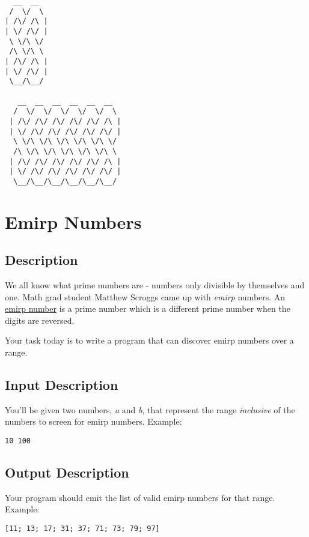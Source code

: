 \begin{lstlisting}
  __  __ 
 /  \/  \
| /\/ /\ |
| \/ /\/ |
 \ \/\ \/
 /\ \/\ \
| /\/ /\ |
| \/ /\/ |
 \__/\__/

   __  __  __  __  __  __
  /  \/  \/  \/  \/  \/  \
 | /\/ /\/ /\/ /\/ /\/ /\ |
 | \/ /\/ /\/ /\/ /\/ /\/ |
  \ \/\ \/\ \/\ \/\ \/\ \/
  /\ \/\ \/\ \/\ \/\ \/\ \
 | /\/ /\/ /\/ /\/ /\/ /\ |
 | \/ /\/ /\/ /\/ /\/ /\/ |
  \__/\__/\__/\__/\__/\__/
\end{lstlisting}


\section{Emirp Numbers}

\subsection*{Description}\label{description-23}

We all know what prime numbers are - numbers only divisible by
themselves and one. Math grad student Matthew Scroggs came up with
\emph{emirp} numbers. An
\href{https://en.wikipedia.org/wiki/Emirp}{emirp number} is a prime
number which is a different prime number when the digits are reversed.

Your task today is to write a program that can discover emirp numbers
over a range.

\subsection*{Input Description}\label{input-description-15}

You'll be given two numbers, \emph{a} and \emph{b}, that represent the
range \emph{inclusive} of the numbers to screen for emirp numbers.
Example:

\begin{lstlisting}
10 100
\end{lstlisting}

\subsection*{Output Description}\label{output-description-16}

Your program should emit the list of valid emirp numbers for that range.
Example:

\begin{lstlisting}
[11; 13; 17; 31; 37; 71; 73; 79; 97]
\end{lstlisting}

